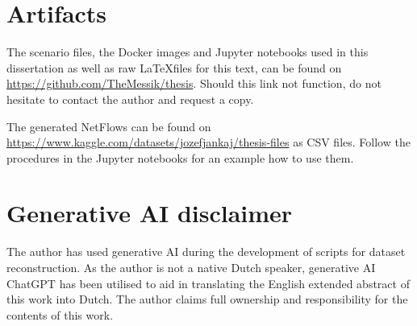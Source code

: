 \section{Artifacts}

The scenario files, the Docker images and Jupyter notebooks used in this dissertation as well as raw \LaTeX \space files for this text, can be found on \url{https://github.com/TheMessik/thesis}. Should this link not function, do not hesitate to contact the author and request a copy.

The generated NetFlows can be found on \url{https://www.kaggle.com/datasets/jozefjankaj/thesis-files} as CSV files. Follow the procedures in the Jupyter notebooks for an example how to use them.

\section{Generative AI disclaimer}
The author has used generative AI during the development of scripts for dataset reconstruction. As the author is not a native Dutch speaker, generative AI ChatGPT has been utilised to aid in translating the English extended abstract of this work into Dutch. The author claims full ownership and responsibility for the contents of this work.